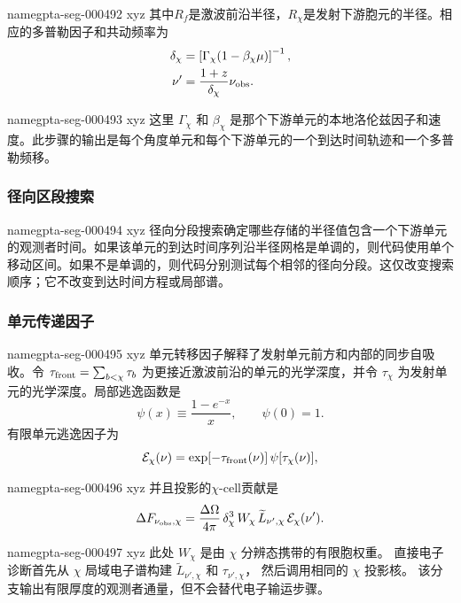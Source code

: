 \documentclass[twocolumn]{aastex702}
\makeatletter
\providecommand{\gptareaderanchor}[1]{\pdfdest name{#1} xyz}%
\providecommand{\gptareaderanchor}[1]{\special{pdf:dest (#1) [ @thispage /XYZ @xpos @ypos null ]}}%
\makeatother
\begin{document}
\gptareaderanchor{gpta-seg-000492}%
其中\(R_f\)是激波前沿半径，\(R_\chi\)是发射下游胞元的半径。相应的多普勒因子和共动频率为
\begin{equation}
\begin{aligned}
\delta_\chi&=\left[\Gamma_\chi(1-\beta_\chi\mu)\right]^{-1},\\
\nu'&=\frac{1+z}{\delta_\chi}\nu_{\rm obs}.
\end{aligned}
\end{equation}

\gptareaderanchor{gpta-seg-000493}%
这里 \(\Gamma_\chi\) 和 \(\beta_\chi\) 是那个下游单元的本地洛伦兹因子和速度。此步骤的输出是每个角度单元和每个下游单元的一个到达时间轨迹和一个多普勒频移。

\subsubsection{径向区段搜索}


\gptareaderanchor{gpta-seg-000494}%
径向分段搜索确定哪些存储的半径值包含一个下游单元的观测者时间。如果该单元的到达时间序列沿半径网格是单调的，则代码使用单个移动区间。如果不是单调的，则代码分别测试每个相邻的径向分段。这仅改变搜索顺序；它不改变到达时间方程或局部谱。

\subsubsection{单元传递因子}


\gptareaderanchor{gpta-seg-000495}%
单元转移因子解释了发射单元前方和内部的同步自吸收。令 \(\tau_{\rm front}=\sum_{b<\chi}\tau_b\) 为更接近激波前沿的单元的光学深度，并令 \(\tau_\chi\) 为发射单元的光学深度。局部逃逸函数是
\begin{equation}
\psi(x)\equiv\frac{1-e^{-x}}{x},\qquad \psi(0)=1 .
\end{equation}
有限单元逃逸因子为
\begin{equation}
\mathcal{E}_\chi(\nu)=
\exp[-\tau_{\rm front}(\nu)]\,\psi[\tau_\chi(\nu)] ,
\end{equation}

\gptareaderanchor{gpta-seg-000496}%
并且投影的\(\chi\)-cell贡献是
\begin{equation}
\Delta F_{\nu_{\rm obs},\chi}=
\frac{\Delta\Omega}{4\pi}\,
\delta_\chi^3\,
W_\chi\,\widetilde L_{\nu',\chi}\,
\mathcal{E}_\chi(\nu').
\end{equation}

\gptareaderanchor{gpta-seg-000497}%
此处 \(W_\chi\) 是由 \(\chi\) 分辨态携带的有限胞权重。
直接电子诊断首先从 \(\chi\) 局域电子谱构建 \(\widetilde L_{\nu',\chi}\) 和 \(\tau_{\nu',\chi}\)，
然后调用相同的 \(\chi\) 投影核。
该分支输出有限厚度的观测者通量，但不会替代电子输运步骤。
\end{document}

